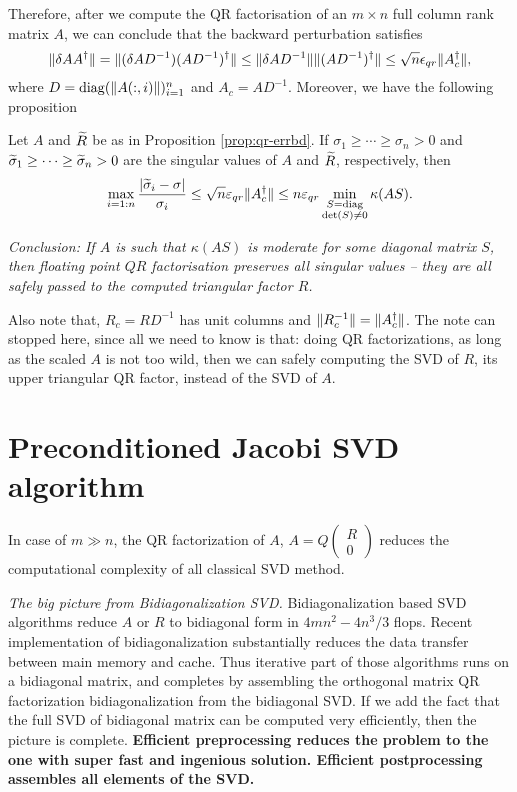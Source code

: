 \documentclass{article}
\begin{document}
Therefore, after we compute the QR factorisation of an $m\times n$ full
column rank matrix $A$, we can conclude that the backward perturbation
satisfies 
\begin{equation}\notag
  \|{\delta AA^{\dagger}}\| = \|{(\delta AD^{-1})(AD^{-1})^{\dagger}}\|
  \leq  \|{\delta AD^{-1}}\|\|{(AD^{-1})^{\dagger}}\|\leq
  \sqrt{n}\epsilon_{qr} \|{A_c^{\dagger}}\|,
\end{equation}
where $D = \operatorname{diag}(\|{A(:,i)}\|)_{i=1}^n$ and $A_c = AD^{-1}$. Moreover, we
have the following proposition
\begin{proposition}
  Let $A$ and $\widetilde R$ be as in Proposition \ref{prop:qr-errbd}. If
  $\sigma_1\ge \cdots  \ge \sigma_n > 0$ and $\widetilde \sigma_1 \ge \cdots \ge
  \widetilde \sigma_n > 0$ are the singular values of $A$ and $\widetilde R$,
  respectively, then  
  \begin{equation}\notag
    \max_{i = 1:n}\frac{|\widetilde \sigma_i-\sigma|}{\sigma_i} \leq  
    \sqrt{n}\varepsilon_{qr}\|{A_c^{\dagger}}\| \le n \varepsilon_{qr} 
    \min_{\substack{S = \operatorname{diag} \\ \det(S)\neq 0}} \kappa(AS). 
  \end{equation}
\end{proposition}

\emph{Conclusion: If $A$ is such that $\kappa(AS)$ is moderate for some
  diagonal matrix $S$, then floating point $QR$ factorisation preserves all
singular values -- they are all safely passed to the computed triangular
factor $R$.} 

Also note that, $R_c = RD^{-1}$ has unit columns and $\|{R_c^{-1}}\| =
\|{A^{\dagger}_c}\|$. The note can stopped here, since all we need to know
is that: doing QR factorizations, as long as the scaled $A$ is not too
wild, then we can safely computing the SVD of $R$, its upper triangular QR
factor, instead of the SVD of $A$.

\section{Preconditioned Jacobi SVD algorithm}
\label{sec:prec-jacobi-svd} 

In case of $m \gg n$, the QR factorization of $A$, $A = Q
\begin{pmatrix}
  R \\ 0
\end{pmatrix}
$ reduces the computational complexity of all classical SVD method.

\emph{The big picture from Bidiagonalization SVD.}
Bidiagonalization based SVD algorithms reduce $A$ or $R$ to bidiagonal form
in $4mn^{2} - 4n^3/3$ flops. Recent implementation of bidiagonalization
substantially reduces the data transfer between main memory and cache. Thus
iterative part of those algorithms runs on a bidiagonal matrix, and
completes by assembling the orthogonal matrix QR factorization
bidiagonalization from the bidiagonal SVD. If we add the fact that the full
SVD of bidiagonal matrix can be computed very efficiently, then the picture
is complete. \bf{Efficient preprocessing reduces the problem to the one
  with super fast and ingenious solution. Efficient postprocessing
  assembles all elements of the SVD.}
\end{document}
